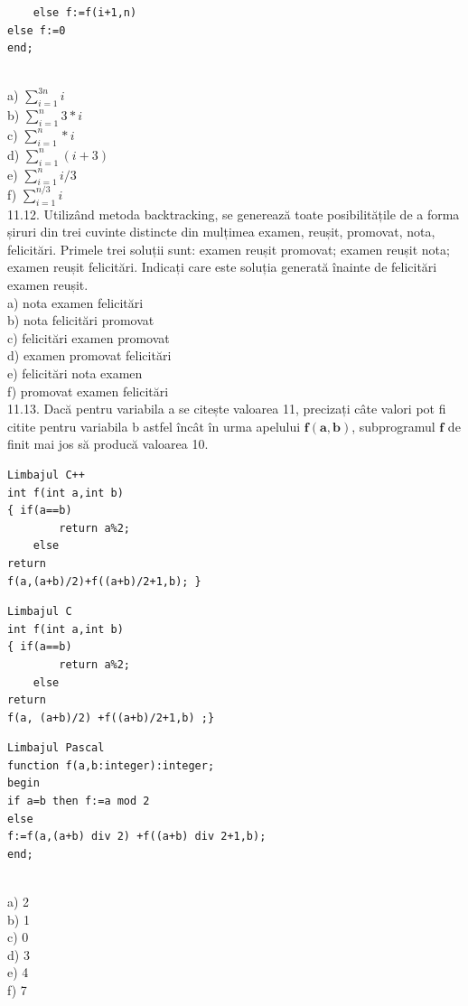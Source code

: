 {\begin{verbatim}
    else f:=f(i+1,n)
else f:=0
end;
\end{verbatim}
\\
a) $\sum_{i=1}^{3 n} i$
\\
b) $\sum_{i=1}^{n} 3 * i$
\\
c) $\sum_{i=1}^{n} * i$
\\
d) $\sum_{i=1}^{n}(i+3)$
\\
e) $\sum_{i=1}^{n} i / 3$
\\
f) $\sum_{i=1}^{n / 3} i$
\\
11.12. Utilizând metoda backtracking, se generează toate posibilitățile de a forma șiruri din trei cuvinte distincte din mulțimea {examen, reușit, promovat, nota, felicitări}. Primele trei soluții sunt: examen reușit promovat; examen reușit nota; examen reușit felicitări. Indicați care este soluția generată înainte de felicitări examen reușit.
\\
a) nota examen felicitări
\\
b) nota felicitări promovat
\\
c) felicitări examen promovat
\\
d) examen promovat felicitări
\\
e) felicitări nota examen
\\
f) promovat examen felicitări
\\
11.13. Dacă pentru variabila a se citește valoarea 11, precizați câte valori pot fi citite pentru variabila b astfel încât în urma apelului $\mathbf{f}(\mathbf{a}, \mathbf{b})$, subprogramul $\mathbf{f}$ de finit mai jos să producă valoarea 10.
\begin{verbatim}
Limbajul C++
int f(int a,int b)
{ if(a==b)
        return a%2;
    else
return
f(a,(a+b)/2)+f((a+b)/2+1,b); }
\end{verbatim}
\begin{verbatim}
Limbajul C
int f(int a,int b)
{ if(a==b)
        return a%2;
    else
return
f(a, (a+b)/2) +f((a+b)/2+1,b) ;}
\end{verbatim}
\begin{verbatim}
Limbajul Pascal
function f(a,b:integer):integer;
begin
if a=b then f:=a mod 2
else
f:=f(a,(a+b) div 2) +f((a+b) div 2+1,b);
end;
\end{verbatim}
\\
a) 2
\\
b) 1
\\
c) 0
\\
d) 3
\\
e) 4
\\
f) 7
\\
}
